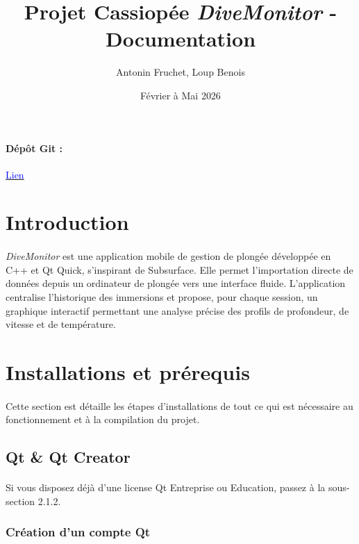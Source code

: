 \documentclass{article}
\title{Projet Cassiopée \textit{DiveMonitor} - Documentation}
\author{Antonin Fruchet, Loup Benois}
\date{Février à Mai 2026}
\begin{document}
\maketitle

\paragraph{Dépôt Git :} \href{https://github.com/AntoFruch/Cassiopee-DiveMonitor}{\textcolor{blue}{Lien}}

\tableofcontents

\section{Introduction}
\paragraph{}
\textit{DiveMonitor} est une application mobile de gestion de plongée développée en C++ et Qt Quick, s'inspirant de Subsurface. Elle permet l'importation directe de données depuis un ordinateur de plongée vers une interface fluide. L'application centralise l'historique des immersions et propose, pour chaque session, un graphique interactif permettant une analyse précise des profils de profondeur, de vitesse et de température.

\section{Installations et prérequis}
\paragraph{}
Cette section est détaille les étapes d'installations de tout ce qui est nécessaire au fonctionnement et à la compilation du projet.

\subsection{Qt \& Qt Creator}
\paragraph{}
Si vous disposez déjà d'une license Qt Entreprise ou Education, passez à la sous-section 2.1.2.
\subsubsection{Création d'un compte Qt}
\end{document}
